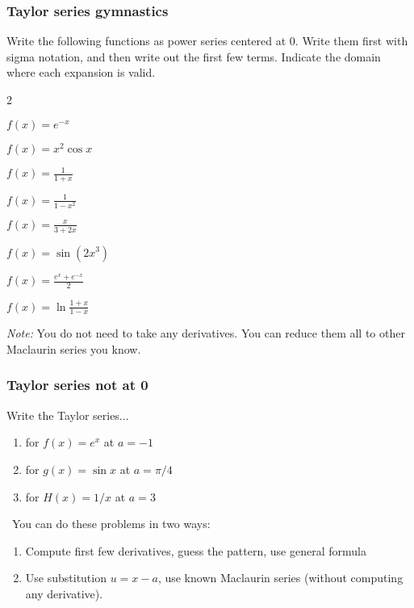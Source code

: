 \documentclass[14pt]{beamer}
\newcommand{\setsize}[1]{\fontsize{#1}{#1}\selectfont} %
\newcommand{\smallerfont}{\setsize{13}} %
\newcommand{\vvv}{\vspace{.2cm}}
\begin{document}
	\begin{frame}[t]
		\smallerfont
		\frametitle{Taylor series gymnastics}

		Write the following functions as power series centered at $0$. Write them first
		with sigma notation, and then write out the first few terms. Indicate the domain
		where each expansion is valid.

		\begin{enumerate}
		\end{enumerate}
		\vvv

		\emph{Note:} You do not need to take any derivatives. You can reduce them
		all to other Maclaurin series you know.
	\end{frame}
	\begin{frame}[t]
		\frametitle{Taylor series not at 0}

		Write the Taylor series...
		\begin{enumerate}
			\item for \; ${\displaystyle f(x) = e^x}$ \; at \; $a=-1$

			\item for \; ${\displaystyle g(x) = \sin x}$ \; at \; ${\displaystyle a = \pi/4}$

			\item for \; ${\displaystyle H(x) = 1/x}$ \; at \; ${\displaystyle a = 3}$
		\end{enumerate}

		\
 You can do these problems in two ways:
		\begin{enumerate}
			\item Compute first few derivatives, guess the pattern, use general formula

			\item Use substitution ${\displaystyle u = x - a}$, use known Maclaurin
				series (without computing any derivative).
		\end{enumerate}
	\end{frame}
\end{document}
